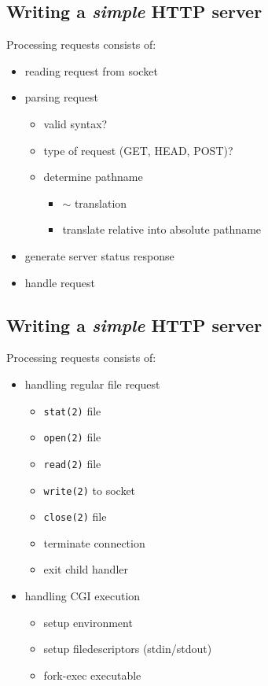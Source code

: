 \documentclass[xga]{xdvislides}
\begin{document}
\subsection{Writing a {\em simple} HTTP server}
Processing requests consists of:
\begin{itemize}
	\item reading request from socket
	\item parsing request
		\begin{itemize}
			\item valid syntax?
			\item type of request (GET, HEAD, POST)?
			\item determine pathname
				\begin{itemize}
					\item $\sim$ translation
					\item translate relative into absolute pathname
				\end{itemize}
		\end{itemize}
	\item generate server status response
	\item handle request
\end{itemize}

\subsection{Writing a {\em simple} HTTP server}
Processing requests consists of:
\begin{itemize}
	\item handling regular file request
		\begin{itemize}
			\item {\tt stat(2)} file
			\item {\tt open(2)} file
			\item {\tt read(2)} file
			\item {\tt write(2)} to socket
			\item {\tt close(2)} file
			\item terminate connection
			\item exit child handler
		\end{itemize}
	\item handling CGI execution
		\begin{itemize}
			\item setup environment
			\item setup filedescriptors (stdin/stdout)
			\item fork-exec executable
		\end{itemize}
\end{itemize}
\end{document}
